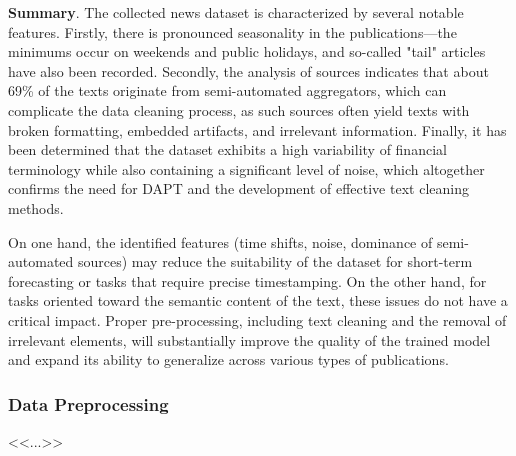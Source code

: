 \textbf{Summary}. The collected news dataset is characterized by several notable features. Firstly, there is pronounced seasonality
in the publications—the minimums occur on weekends and public holidays, and so-called "tail" articles have also been recorded.
Secondly, the analysis of sources indicates that about 69\% of the texts originate from semi-automated aggregators, which can complicate
the data cleaning process, as such sources often yield texts with broken formatting, embedded artifacts, and irrelevant information.
Finally, it has been determined that the dataset exhibits a high variability of financial terminology while also containing a significant
level of noise, which altogether confirms the need for DAPT and the development of effective text cleaning
methods.

On one hand, the identified features (time shifts, noise, dominance of semi-automated sources) may reduce the suitability of the dataset
for short-term forecasting or tasks that require precise timestamping. On the other hand, for tasks oriented toward the semantic content
of the text, these issues do not have a critical impact. Proper pre-processing, including text cleaning and the removal of irrelevant
elements, will substantially improve the quality of the trained model and expand its ability to generalize across various types of publications.

\subsubsection{Data Preprocessing}
\label{sec:data_prep}
<<...>>
